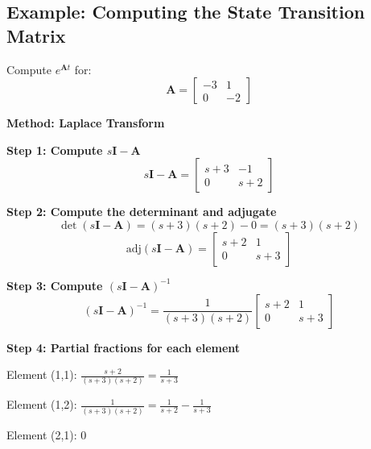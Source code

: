 \subsection{Example: Computing the State Transition Matrix}

\begin{example}
\label{ex:state_transition}
Compute $e^{\mathbf{A}t}$ for:
\begin{equation}
\mathbf{A} = \begin{bmatrix} -3 & 1 \\ 0 & -2 \end{bmatrix}
\end{equation}

\textbf{Method: Laplace Transform}

\textbf{Step 1: Compute $s\mathbf{I} - \mathbf{A}$}
\begin{equation}
s\mathbf{I} - \mathbf{A} = \begin{bmatrix} s+3 & -1 \\ 0 & s+2 \end{bmatrix}
\end{equation}

\textbf{Step 2: Compute the determinant and adjugate}
\begin{equation}
\det(s\mathbf{I} - \mathbf{A}) = (s+3)(s+2) - 0 = (s+3)(s+2)
\end{equation}
\begin{equation}
\text{adj}(s\mathbf{I} - \mathbf{A}) = \begin{bmatrix} s+2 & 1 \\ 0 & s+3 \end{bmatrix}
\end{equation}

\textbf{Step 3: Compute $(s\mathbf{I} - \mathbf{A})^{-1}$}
\begin{equation}
(s\mathbf{I} - \mathbf{A})^{-1} = \frac{1}{(s+3)(s+2)}\begin{bmatrix} s+2 & 1 \\ 0 & s+3 \end{bmatrix}
\end{equation}

\textbf{Step 4: Partial fractions for each element}

Element (1,1): $\frac{s+2}{(s+3)(s+2)} = \frac{1}{s+3}$

Element (1,2): $\frac{1}{(s+3)(s+2)} = \frac{1}{s+2} - \frac{1}{s+3}$

Element (2,1): $0$


\end{example}

